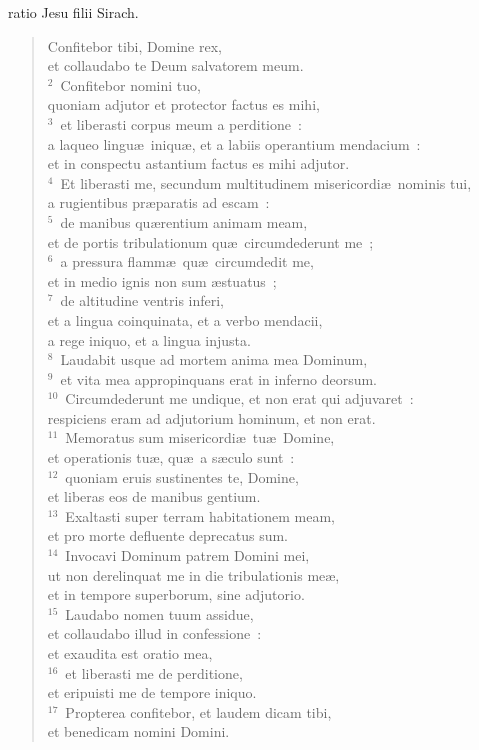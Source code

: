 \bchapter
{}ratio Jesu filii Sirach. \begin{verse}\vspace{6pt}Confitebor tibi, Domine rex,\\ et collaudabo te Deum salvatorem meum.\\
${}^{2}$~Confitebor nomini tuo,\\ quoniam adjutor et protector factus es mihi,\\
${}^{3}$~et liberasti corpus meum a perditione~:\\ a laqueo lingu\ae\ iniqu\ae , et a labiis operantium mendacium~:\\ et in conspectu astantium factus es mihi adjutor.\\
${}^{4}$~Et liberasti me, secundum multitudinem misericordi\ae\ nominis tui,\\ a rugientibus pr\ae paratis ad escam~:\\
${}^{5}$~de manibus qu\ae rentium animam meam,\\ et de portis tribulationum qu\ae\ circumdederunt me~;\\
${}^{6}$~a pressura flamm\ae\ qu\ae\ circumdedit me,\\ et in medio ignis non sum \ae stuatus~;\\
${}^{7}$~de altitudine ventris inferi,\\ et a lingua coinquinata, et a verbo mendacii,\\ a rege iniquo, et a lingua injusta.\\
${}^{8}$~Laudabit usque ad mortem anima mea Dominum,\\
${}^{9}$~et vita mea appropinquans erat in inferno deorsum.\\
${}^{10}$~Circumdederunt me undique, et non erat qui adjuvaret~:\\ respiciens eram ad adjutorium hominum, et non erat.\\
${}^{11}$~Memoratus sum misericordi\ae\ tu\ae\ Domine,\\ et operationis tu\ae , qu\ae\ a s\ae culo sunt~:\\
${}^{12}$~quoniam eruis sustinentes te, Domine,\\ et liberas eos de manibus gentium.\\
${}^{13}$~Exaltasti super terram habitationem meam,\\ et pro morte defluente deprecatus sum.\\
${}^{14}$~Invocavi Dominum patrem Domini mei,\\ ut non derelinquat me in die tribulationis me\ae ,\\ et in tempore superborum, sine adjutorio.\\
${}^{15}$~Laudabo nomen tuum assidue,\\ et collaudabo illud in confessione~:\\ et exaudita est oratio mea,\\
${}^{16}$~et liberasti me de perditione,\\ et eripuisti me de tempore iniquo.\\
${}^{17}$~Propterea confitebor, et laudem dicam tibi,\\ et benedicam nomini Domini.\end{verse}


